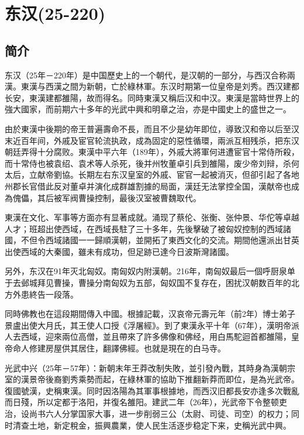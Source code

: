 
\chapter{东汉\tiny(25-220)}

\section{简介}

东汉（25年－220年）是中国歷史上的一个朝代，是汉朝的一部分，与西汉合称兩漢。東漢与西漢之間为新朝，亡於綠林軍。东汉时期第一位皇帝是刘秀。西汉建都长安，東漢建都雒陽，故而得名。同時東漢又稱后汉和中汉。東漢是當時世界上的強大國家，而前期六十多年的光武中興和明章之治，亦是中國史上的盛世之一。

由於東漢中後期的帝王普遍壽命不長，而且不少是幼年即位，導致汉和帝以后至汉末近百年间，外戚及宦官轮流执政，成為固定的惡性循環，兩派互相残杀，把东汉朝廷弄得十分腐败。東漢中平六年（189年），外戚大將軍何进遭宦官十常侍所殺，而十常侍也被袁绍、袁术等人杀死，後并州牧董卓引兵到雒陽，废少帝刘辩，杀何太后，立献帝劉協。长期左右东汉皇室的外戚、宦官一起被消灭，但卻引起了各地州郡长官借此反对董卓并演化成群雄割據的局面，漢廷无法掌控全国，漢献帝也成為傀儡，其后被军阀曹操控制，最後汉室被曹魏取代。

東漢在文化、军事等方面亦有显著成就。涌现了蔡伦、张衡、张仲景、华佗等卓越人才；班超出使西域，在西域長駐了三十多年，先後擊破了被匈奴控制的西域諸國，不但令西域諸國一一歸順漢朝，並開拓了東西文化的交流。期間他還派出甘英出使西域的大秦國，雖未有成功，但足跡已達今日波斯灣諸國。

另外，东汉在91年灭北匈奴。南匈奴内附漢朝。216年，南匈奴最后一個呼厨泉单于去邺城拜见曹操，曹操分南匈奴为五部，匈奴国不复存在，困扰汉朝数百年的北方外患終告一段落。

同時佛教也在這段期間傳入中國。根據記載，汉哀帝元壽元年（前2年）博士弟子景盧出使大月氏，其王使人口授《浮屠經》。到了東漢永平十年（67年），漢明帝派人去西域，迎來兩位高僧，並且帶來了許多佛像和佛经，用白馬駝迴首都雒陽，皇帝命人修建房屋供其居住，翻譯佛經。也就是現在的白马寺。

光武中兴（25年－57年）：新朝末年王莽改制失敗，並引發內戰，其時身為漢朝宗室的漢景帝後裔劉秀乘勢而起，在綠林軍的協助下推翻新莽而即位，是為光武帝。復國號漢，史稱東漢。同时因洛陽為其軍事根據地，而西汉旧都長安亦逢多次戰亂而日殘，所以定都于洛阳，并復名雒阳。建武二年（26年），光武帝下令整顿吏治，设尚书六人分掌国家大事，进一步削弱三公（太尉、司徒、司空）的权力；同时清查土地，新定稅金，振興農業，使人民生活逐步稳定下来，史稱光武中興。

